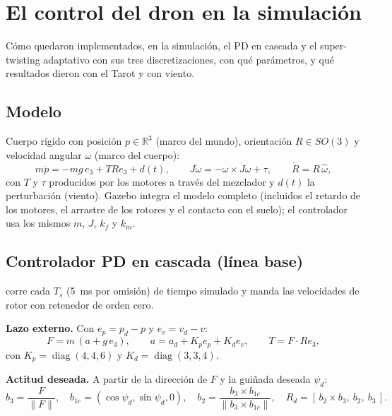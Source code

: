 \chapter{El control del dron en la simulación}
\label{cap:control-sim}

\begin{enpocas}
Cómo quedaron implementados, en la simulación, el PD en cascada y el super-twisting adaptativo con sus
tres discretizaciones, con qué parámetros, y qué resultados dieron con el Tarot y con viento.
\end{enpocas}

\section{Modelo}

Cuerpo rígido con posición $p\in\mathbb{R}^3$ (marco del mundo), orientación $R\in SO(3)$ y
velocidad angular $\omega$ (marco del cuerpo):
\begin{equation}
m\ddot p = -mg\,e_3 + T R e_3 + d(t),\qquad
J\dot\omega = -\omega\times J\omega + \tau,\qquad \dot R = R\,\hat\omega,
\end{equation}
con $T$ y $\tau$ producidos por los motores a través del mezclador y $d(t)$ la perturbación
(viento). Gazebo integra el modelo completo (incluidos el retardo de los motores, el arrastre de
los rotores y el contacto con el suelo); el controlador usa los mismos $m$, $J$, $k_f$ y $k_m$.

\section{Controlador PD en cascada (línea base)}

 corre cada $T_s$ (5~ms por omisión) de tiempo simulado y manda las
velocidades de rotor con retenedor de orden cero.

\textbf{Lazo externo.} Con $e_p = p_d - p$ y $e_v = v_d - v$:
\begin{equation}
F = m\,(a + g\,e_3),\qquad a = a_d + K_p e_p + K_d e_v,\qquad T = F\cdot R e_3,
\end{equation}
con $K_p = \operatorname{diag}(4,4,6)$ y $K_d = \operatorname{diag}(3,3,4)$.

\textbf{Actitud deseada.} A partir de la dirección de $F$ y la guiñada deseada $\psi_d$:
\begin{equation}
b_3 = \frac{F}{\|F\|},\quad b_{1c} = (\cos\psi_d,\sin\psi_d,0),\quad
b_2 = \frac{b_3\times b_{1c}}{\|b_3\times b_{1c}\|},\quad R_d = [\,b_2\times b_3,\ b_2,\ b_3\,].
\end{equation}

